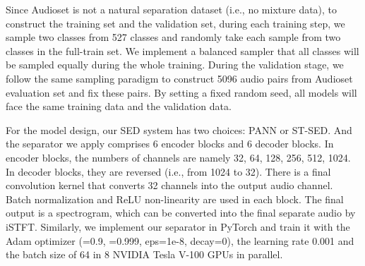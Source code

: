 \documentclass[letterpaper]{article} \usepackage{aaai22}  \usepackage{times}  \usepackage{helvet}  \usepackage{courier}  \usepackage[hyphens]{url}  \usepackage{graphicx} \urlstyle{rm} \def\UrlFont{\rm}  \usepackage{natbib}  \usepackage{caption} \DeclareCaptionStyle{ruled}{labelfont=normalfont,labelsep=colon,strut=off} \frenchspacing  \setlength{\pdfpagewidth}{8.5in}  \setlength{\pdfpageheight}{11in}  \usepackage{algorithm}
\begin{document}
Since Audioset is not a natural separation dataset (i.e., no mixture data), to construct the training set and the validation set, during each training step, we sample two classes from 527 classes and randomly take each sample  from two classes in the full-train set. We implement a balanced sampler that all classes will be sampled equally during the whole training. During the validation stage, we follow the same sampling paradigm to construct 5096 audio pairs from Audioset evaluation set and fix these pairs. By setting a fixed random seed, all models will face the same training data and the validation data. 

For the model design, our SED system has two choices: PANN or ST-SED. And the separator we apply comprises 6 encoder blocks and 6 decoder blocks. In encoder blocks, the numbers of channels are namely 32, 64, 128, 256, 512, 1024. In decoder blocks, they are reversed (i.e., from 1024 to 32). There is a final convolution kernel that converts 32 channels into the output audio channel. Batch normalization \cite{bn} and ReLU non-linearity \cite{relu} are used in each block. The final output is a spectrogram, which can be converted into the final separate audio  by iSTFT. Similarly, we implement our separator in PyTorch and train it with the Adam optimizer (=0.9, =0.999, eps=1e-8, decay=0), the learning rate 0.001 and the batch size of 64 in 8 NVIDIA Tesla V-100 GPUs in parallel. 
\end{document}
